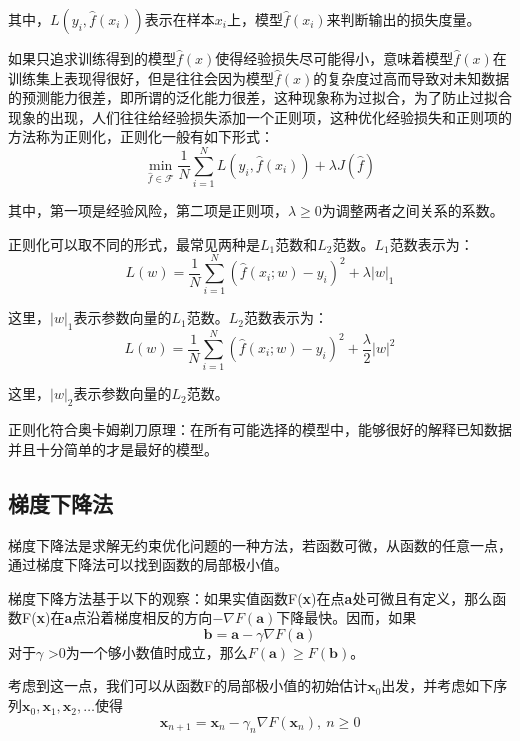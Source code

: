 其中，$L\left( y_i,\hat{f}\left( x_i \right) \right) $表示在样本$x_i$上，模型$\hat{f}\left( x_i \right)$来判断输出的损失度量。

如果只追求训练得到的模型$\hat{f}\left( x \right) $使得经验损失尽可能得小，意味着模型$\hat{f}\left( x \right) $在训练集上表现得很好，但是往往会因为模型$\hat{f}\left( x \right) $的复杂度过高而导致对未知数据的预测能力很差，即所谓的泛化能力很差，这种现象称为过拟合，为了防止过拟合现象的出现，人们往往给经验损失添加一个正则项，这种优化经验损失和正则项的方法称为正则化，正则化一般有如下形式：
\begin{equation}
\label{regularization}
\min_{\hat{f}\in \mathcal{F}} \frac{1}{N}\sum_{i=1}^N{L}\left( y_i,\hat{f}\left( x_i \right) \right) +\lambda J\left( \hat{f} \right) 
\end{equation}

其中，第一项是经验风险，第二项是正则项，$\lambda \geqslant 0$为调整两者之间关系的系数。

正则化可以取不同的形式，最常见两种是$L_1$范数和$L_2$范数。$L_1$范数表示为：
\[
L\left( w \right) =\frac{1}{N}\sum_{i=1}^N{\left( \hat{f}\left( x_i;w \right) -y_i \right) ^2}+\lambda |w|_1
\]

这里，$|w|_1$表示参数向量的$L_1$范数。$L_2$范数表示为：
\[L\left( w \right) =\frac{1}{N}\sum_{i=1}^N{\left( \hat{f}\left( x_i;w \right) -y_i \right) ^2}+\frac{\lambda}{2}|w|^2\]

这里，$|w|_2$表示参数向量的$L_2$范数。

正则化符合奥卡姆剃刀原理：在所有可能选择的模型中，能够很好的解释已知数据并且十分简单的才是最好的模型。

\subsection{梯度下降法}
梯度下降法是求解无约束优化问题的一种方法，若函数可微，从函数的任意一点，通过梯度下降法可以找到函数的局部极小值。

梯度下降方法基于以下的观察：如果实值函数F(\textbf{x})在点\textbf{a}处可微且有定义，那么函数F(\textbf{x})在\textbf{a}点沿着梯度相反的方向$-\nabla F(\mathbf{a})$下降最快。因而，如果
\[\mathbf{b}=\mathbf{a}-\gamma \nabla F\left( \mathbf{a} \right) \]
对于$\gamma$ >0为一个够小数值时成立，那么$F(\mathbf{a})\geq F(\mathbf{b})$。

考虑到这一点，我们可以从函数F的局部极小值的初始估计$\mathbf{x}_0$出发，并考虑如下序列$\mathbf{x}_{0}, \mathbf{x}_{1}, \mathbf{x}_{2}, \dots$使得
\[
\mathbf{x}_{n+1}=\mathbf{x}_n-\gamma_n \nabla F(\mathbf{x}_n),\ n \ge 0
\]


